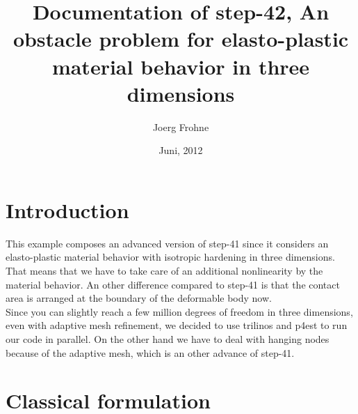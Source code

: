 \documentclass{article}
\title{Documentation of step-42, An obstacle problem for elasto-plastic material behavior in three dimensions}
\author{Joerg Frohne}
\date{Juni, 2012}
\begin{document}
\section{Introduction}

This example composes an advanced version of step-41 since it considers an
elasto-plastic material behavior with isotropic hardening in three dimensions.
That means that we have to take care of an additional nonlinearity by the
material behavior. An other difference compared to step-41 is that
the contact area is arranged at the boundary of the deformable body now.\\
Since you can slightly reach a few million degrees of freedom in three dimensions,
even with adaptive mesh refinement, we decided to use trilinos and p4est to run
our code in parallel. On the other hand we have to deal with hanging nodes because
of the adaptive mesh, which is an other advance of step-41.


\section{Classical formulation}
\end{document}
